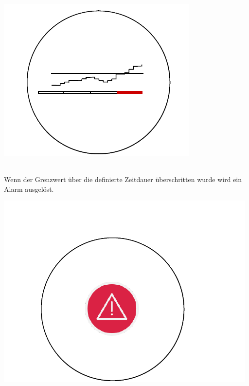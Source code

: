 \documentclass[a4paper,10pt]{scrartcl}
\begin{document}
\begin{minipage}{\linewidth}
  \includegraphics[scale=.3]{img/Datenaggregation/GrafAlarmNew.png} 
\end{minipage}\\

Wenn der Grenzwert über die definierte Zeitdauer überschritten wurde wird ein Alarm ausgelöst.\\

\begin{minipage}{\linewidth}
  \includegraphics[scale=.3]{img/Datenaggregation/AlarmNew.png}  
\end{minipage} \\
\end{document}
